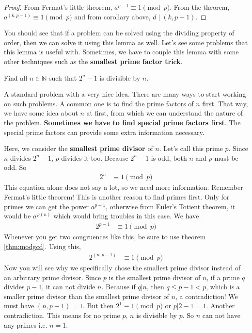 \documentclass{subfile}
\begin{document}
		\begin{proof}
			From Fermat's little theorem, $a^{p-1}\equiv1\pmod p$. From the theorem, $a^{(k,p-1)}\equiv1\pmod p$ and from corollary above, $d\mid (k,p-1)$.
		\end{proof}
	You should see that if a problem can be solved using the dividing property of order, then we can solve it using this lemma as well. Let's see some problems that this lemma is useful with. Sometimes, we have to couple this lemma with some other techniques such as the \textbf{smallest prime factor trick}.

	\begin{problem}
		Find all $n\in\mathbb{N}$ such that $2^n-1$ is divisible by $n$.
	\end{problem}
	A standard problem with a very nice idea. There are many ways to start working on such problems. A common one is to find the prime factors of $n$ first. That way, we have some idea about $n$ at first, from which we can understand the nature of the problem. \textbf{Sometimes we have to find special prime factors first}. The special prime factors can provide some extra information necessary.
	\begin{solution}
		Here, we consider the \textbf{smallest prime divisor} of $n$. Let's call this prime $p$. Since $n$ divides $2^n-1$, $p$ divides it too. Because $2^n-1$ is odd, both $n$ and $p$ must be odd. So
		\begin{align*}
			2^n & \equiv1\pmod p
		\end{align*}
		This equation alone does not say a lot, so we need more information. Remember Fermat's little theorem! This is another reason to find primes first. Only for primes we can get the power $a^{p-1}$, otherwise from Euler's Totient theorem, it would be $a^{\varphi(n)}$ which would bring troubles in this case. We have
		\begin{align*}
			2^{p-1} & \equiv1\pmod p
		\end{align*}
		Whenever you get two congruences like this, be sure to use theorem \eqref{thm:modgcd}. Using this,
		\begin{align*}
			2^{(n,p-1)} & \equiv1\pmod p
		\end{align*}
		Now you will see why we specifically chose the smallest prime divisor instead of an arbitrary prime divisor. Since $p$ is the smallest prime divisor of $n$, if a prime $q$ divides $p-1$, it can not divide $n$. Because if $q|n$, then $q\leq p-1<p$, which is a smaller prime divisor than the smallest prime divisor of $n$, a contradiction! We must have $(n,p-1)=1$. But then $2^1\equiv1\pmod p$ or $p|2-1=1$. Another contradiction. This means for no prime $p$, $n$ is divisible by $p$. So $n$ can  not have any primes i.e. $n=1$.
	\end{solution}
\end{document}
